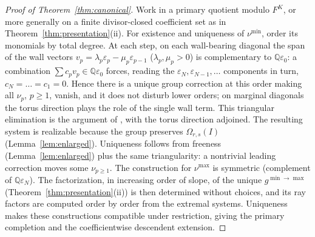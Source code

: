 \documentclass[11pt]{amsart}
\theoremstyle{definition}
\theoremstyle{remark}
\newcommand{\QQ}{\mathbb{Q}}
\newcommand{\Om}{\Omega_{r,s}}
\begin{document}
\begin{proof}[Proof of Theorem~\ref{thm:canonical}]
Work in a primary quotient modulo $F^K$, or more generally on a finite
divisor-closed coefficient set as in Theorem~\ref{thm:presentation}(ii).
For existence and uniqueness of $\nu^{\min}$, order its monomials by total
degree. At each step, on each wall-bearing diagonal the span of the wall
vectors $v_{p}=\lambda_{p}\varepsilon_{p}-\mu_{p}\varepsilon_{p-1}$ ($\lambda_{p},\mu_{p}>0$) is complementary to
$\QQ\varepsilon_{0}$: a combination $\sum c_{p}v_{p}\in\QQ\varepsilon_{0}$ forces, reading the
$\varepsilon_{N},\varepsilon_{N-1},\dots$ components in turn, $c_{N}=\dots=c_{1}=0$. Hence there is a
unique group correction at this order making all $\nu_{p}$, $p\ge1$, vanish, and
it does not disturb lower orders; on marginal diagonals the torus direction plays
the role of the single wall term.  This triangular elimination is the argument of
\cite[proof of Thm.~4.27, Step~3]{GKT}, with the torus direction adjoined. The resulting system is realizable because the group
preserves $\Om(I)$ (Lemma~\ref{lem:enlarged}). Uniqueness follows from
freeness (Lemma~\ref{lem:enlarged}) plus the same triangularity: a nontrivial leading correction moves some
$\nu_{p\ge1}$. The construction for $\nu^{\max}$ is symmetric (complement of
$\QQ\varepsilon_{N}$). The factorization, in increasing order of slope, of the unique
$g^{\min\to\max}$ (Theorem~\ref{thm:presentation}(ii)) is then determined
without choices, and its ray factors are computed order by order from the
extremal systems. Uniqueness
makes these constructions compatible under restriction, giving the primary
completion and the coefficientwise descendent extension.
\end{proof}
\end{document}
